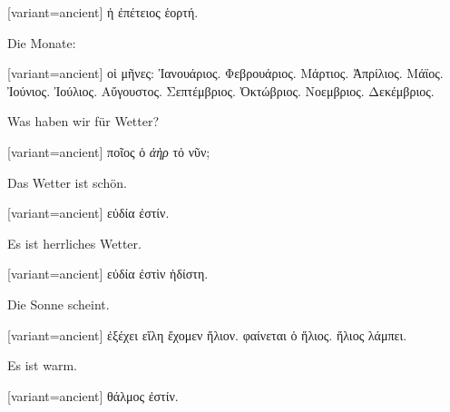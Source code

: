 \begin{greek}[variant=ancient]%
ἡ ἐπέτειος ἑορτή.

\end{greek}%
\switchcolumn*[\centering\rule{1.5in}{1pt}]

Die Monate:

\switchcolumn

\begin{greek}[variant=ancient]%
οἱ μῆνες: Ἰανουάριος. Φεβρουάριος. Μάρτιος. Ἀπρίλιος. Μάϊος. Ἰούνιος.
Ἰούλιος. Αὔγουστος. Σεπτέμβριος. Ὀκτώβριος. Νοεμβριος. Δεκέμβριος.

\end{greek}%
\indent Was haben wir für Wetter?

\switchcolumn

\begin{greek}[variant=ancient]%
ποῖος ὁ \emph{ἀὴρ} τό νῦν;

\end{greek}%
\switchcolumn*

Das Wetter ist schön.

\switchcolumn

\begin{greek}[variant=ancient]%
εὐδία ἐστίν.

\end{greek}%
\switchcolumn*

Es ist herrliches Wetter.

\switchcolumn

\begin{greek}[variant=ancient]%
εὐδία ἐστὶν ἡδίστη.

\end{greek}%
\switchcolumn*

Die Sonne scheint.

\switchcolumn

\begin{greek}[variant=ancient]%
ἐξέχει εἵλη ἔχομεν ἥλιον. φαίνεται ὁ ἥλιος. ἥλιος λάμπει.

\end{greek}%
\switchcolumn*

Es ist warm.

\switchcolumn

\begin{greek}[variant=ancient]%
θάλμος ἐστίν.

\end{greek}%
\switchcolumn*


